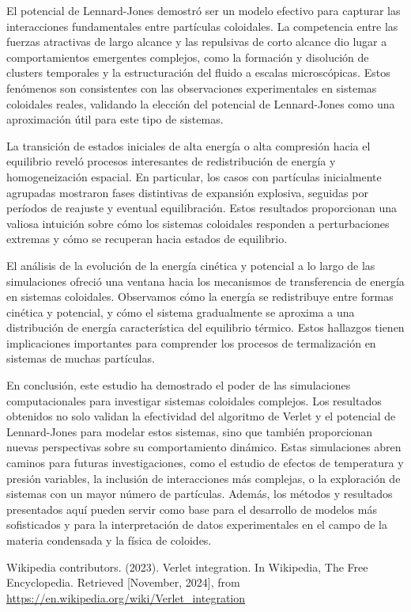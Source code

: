 \documentclass[twocolumn]{article}
\begin{document}
El potencial de Lennard-Jones demostró ser un modelo efectivo para capturar las interacciones fundamentales entre partículas coloidales. La competencia entre las fuerzas atractivas de largo alcance y las repulsivas de corto alcance dio lugar a comportamientos emergentes complejos, como la formación y disolución de clusters temporales y la estructuración del fluido a escalas microscópicas. Estos fenómenos son consistentes con las observaciones experimentales en sistemas coloidales reales, validando la elección del potencial de Lennard-Jones como una aproximación útil para este tipo de sistemas.

La transición de estados iniciales de alta energía o alta compresión hacia el equilibrio reveló procesos interesantes de redistribución de energía y homogeneización espacial. En particular, los casos con partículas inicialmente agrupadas mostraron fases distintivas de expansión explosiva, seguidas por períodos de reajuste y eventual equilibración. Estos resultados proporcionan una valiosa intuición sobre cómo los sistemas coloidales responden a perturbaciones extremas y cómo se recuperan hacia estados de equilibrio.

El análisis de la evolución de la energía cinética y potencial a lo largo de las simulaciones ofreció una ventana hacia los mecanismos de transferencia de energía en sistemas coloidales. Observamos cómo la energía se redistribuye entre formas cinética y potencial, y cómo el sistema gradualmente se aproxima a una distribución de energía característica del equilibrio térmico. Estos hallazgos tienen implicaciones importantes para comprender los procesos de termalización en sistemas de muchas partículas.

En conclusión, este estudio ha demostrado el poder de las simulaciones computacionales para investigar sistemas coloidales complejos. Los resultados obtenidos no solo validan la efectividad del algoritmo de Verlet y el potencial de Lennard-Jones para modelar estos sistemas, sino que también proporcionan nuevas perspectivas sobre su comportamiento dinámico. Estas simulaciones abren caminos para futuras investigaciones, como el estudio de efectos de temperatura y presión variables, la inclusión de interacciones más complejas, o la exploración de sistemas con un mayor número de partículas. Además, los métodos y resultados presentados aquí pueden servir como base para el desarrollo de modelos más sofisticados y para la interpretación de datos experimentales en el campo de la materia condensada y la física de coloides.

\begin{thebibliography}{9}
 Wikipedia contributors. (2023). Verlet integration. In Wikipedia, The Free Encyclopedia. Retrieved [November, 2024], from \url{https://en.wikipedia.org/wiki/Verlet_integration}
\end{thebibliography}
\end{document}
